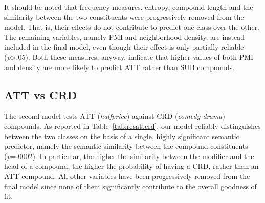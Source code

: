 \documentclass[output=paper]{langsci/langscibook}
\begin{document}
It should be noted that frequency measures, entropy, compound length and the similarity between the two constituents were progressively removed from the model. That is, their effects do not contribute to predict one class over the other. The remaining variables, namely PMI and neighborhood density, are instead included in the final model, even though their effect is only partially reliable (\emph{p}>.05). Both these measures, anyway, indicate that higher values of both PMI and density are more likely to predict ATT rather than SUB compounds.



\subsection{ATT vs CRD}

The second model tests ATT (\emph{halfprice}) against CRD (\emph{comedy-drama}) compounds. As reported in Table~\ref{tab:resattcrd}, our model reliably distinguishes between the two classes on the basis of a single, highly significant semantic predictor, namely the semantic similarity between the compound constituents (\emph{p}=.0002). In particular, the higher the similarity between the modifier and the head of a compound, the higher the probability of having a CRD, rather than an ATT compound. All other variables have been progressively removed from the final model since none of them significantly contribute to the overall goodness of fit.
\end{document}
